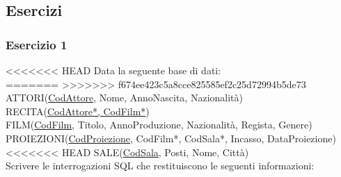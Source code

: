 \documentclass[a4paper]{article}
\begin{document}
\subsection{Esercizi}
\subsubsection{Esercizio 1}
<<<<<<< HEAD
Data la seguente base di dati:\medskip\\
=======
>>>>>>> f674ee423c5a8cce825585ef2c25d72994b5de73
ATTORI(\underline{CodAttore}, Nome, AnnoNascita, Nazionalità)\\
RECITA(\underline{CodAttore*, CodFilm*})\\
FILM(\underline{CodFilm}, Titolo, AnnoProduzione, Nazionalità, Regista, Genere)\\
PROIEZIONI(\underline{CodProiezione}, CodFilm*, CodSala*, Incasso, DataProiezione)\\
<<<<<<< HEAD
SALE(\underline{CodSala}, Posti, Nome, Città)\medskip\\
%
Scrivere le interrogazioni SQL che restituiscono le seguenti informazioni:
\end{document}
